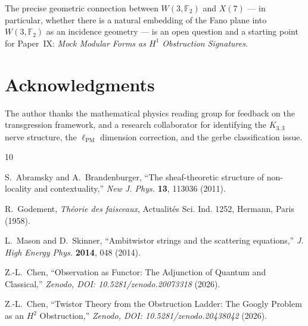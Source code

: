 \documentclass[11pt,a4paper]{article}
\theoremstyle{remark}
\begin{document}
The precise geometric connection between $W(3, \mathbb{F}_2)$ and $X(7)$
--- in particular, whether there is a natural embedding of the Fano plane
into $W(3, \mathbb{F}_2)$ as an incidence geometry --- is an open question
and a starting point for Paper~IX:
\emph{Mock Modular Forms as $H^1$ Obstruction Signatures}.

\section*{Acknowledgments}

The author thanks the mathematical physics reading group for feedback
on the transgression framework, and a research collaborator for
identifying the $K_{3,3}$ nerve structure, the $\ell_{\text{PM}}$
dimension correction, and the gerbe classification issue.

\begin{thebibliography}{10}

S.~Abramsky and A.~Brandenburger,
``The sheaf-theoretic structure of non-locality and contextuality,''
\textit{New J. Phys.} \textbf{13}, 113036 (2011).

R.~Godement,
\textit{Th\'eorie des faisceaux},
Actualit\'es Sci. Ind. 1252,
Hermann, Paris (1958).

L.~Mason and D.~Skinner,
``Ambitwistor strings and the scattering equations,''
\textit{J. High Energy Phys.} \textbf{2014}, 048 (2014).

Z.-L.~Chen,
``Observation as Functor: 
The Adjunction of Quantum and Classical,''
\textit{Zenodo, DOI: 10.5281/zenodo.20073318} (2026).

Z.-L.~Chen,
``Twistor Theory from the Obstruction Ladder:
The Googly Problem as an $H^2$ Obstruction,''
\textit{Zenodo, DOI: 10.5281/zenodo.20438042} (2026).

\end{thebibliography}
\end{document}
